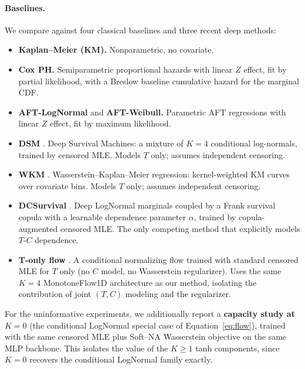 \paragraph{Baselines.}
We compare against four classical baselines and three recent deep methods:
\begin{itemize}
    \item \textbf{Kaplan--Meier (KM).} Nonparametric, no covariate.
    \item \textbf{Cox PH.} Semiparametric proportional hazards with linear
          $Z$ effect, fit by partial likelihood, with a Breslow baseline
          cumulative hazard for the marginal CDF.
    \item \textbf{AFT-LogNormal} and \textbf{AFT-Weibull.} Parametric AFT
          regressions with linear $Z$ effect, fit by maximum likelihood.
    \item \textbf{DSM} \citep{nagpal2021dsm}. Deep Survival Machines: a
          mixture of $K{=}4$ conditional log-normals, trained by censored
          MLE. Models $T$ only; assumes independent censoring.
    \item \textbf{WKM} \citep{zhou2024wkm}. Wasserstein--Kaplan--Meier
          regression: kernel-weighted KM curves over covariate bins.
          Models $T$ only; assumes independent censoring.
    \item \textbf{DCSurvival} \citep{zhang2024deepcopula}. Deep LogNormal
          marginals coupled by a Frank survival copula with a learnable
          dependence parameter $\alpha$, trained by copula-augmented
          censored MLE. The only competing method that explicitly models
          $T$-$C$ dependence.
    \item \textbf{T-only flow} \citep{ausset2021conditional}. A
          conditional normalizing flow trained with standard censored MLE
          for $T$ only (no $C$ model, no Wasserstein regularizer). Uses
          the same $K{=}4$ MonotoneFlow1D architecture as our method,
          isolating the contribution of joint $(T, C)$ modeling and the
          regularizer.
\end{itemize}
For the uninformative experiments, we additionally report a
\textbf{capacity study at $K = 0$} (the conditional LogNormal special
case of Equation~\eqref{eq:flow}), trained with the same censored MLE
plus Soft--NA Wasserstein objective on the same MLP backbone. This
isolates the value of the $K \ge 1$ tanh components, since $K = 0$
recovers the conditional LogNormal family exactly.


